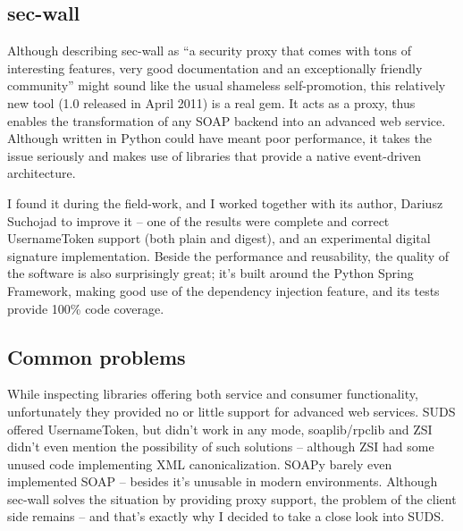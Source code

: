 \subsection{sec-wall}

Although \cite{sec-wall-homepage} describing sec-wall as ``a security proxy that comes with tons of interesting features, very good documentation and an exceptionally friendly community'' might sound like the usual shameless self-promotion, this relatively new tool (1.0 released in April 2011) is a real gem. It acts as a proxy, thus enables the transformation of any SOAP backend into an advanced web service. Although written in Python could have meant poor performance, it takes the issue seriously and makes use of libraries that provide a native event-driven architecture.

I found it during the field-work, and I worked together with its author, Dariusz Suchojad to improve it -- one of the results were complete and correct UsernameToken support (both plain and digest), and an experimental digital signature implementation. Beside the performance and reusability, the quality of the software is also surprisingly great; it's built around the Python Spring Framework, making good use of the dependency injection feature, and its tests provide 100\% code coverage.

\subsection{Common problems}

While inspecting libraries offering both service and consumer functionality, unfortunately they provided no or little support for advanced web services. SUDS offered UsernameToken, but didn't work in any mode, soaplib/rpclib and ZSI didn't even mention the possibility of such solutions -- although ZSI had some unused code implementing XML canonicalization. SOAPy barely even implemented SOAP -- besides it's unusable in modern environments. Although sec-wall solves the situation by providing proxy support, the problem of the client side remains -- and that's exactly why I decided to take a close look into SUDS.

